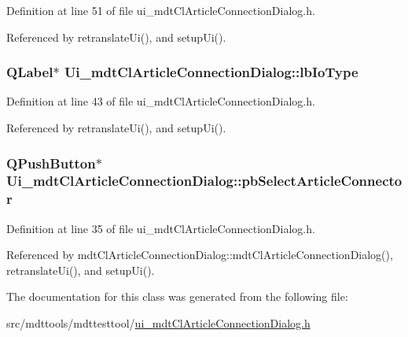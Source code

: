 Definition at line 51 of file ui\-\_\-mdt\-Cl\-Article\-Connection\-Dialog.\-h.



Referenced by retranslate\-Ui(), and setup\-Ui().

\hypertarget{class_ui__mdt_cl_article_connection_dialog_a092df073f3829e7d3250627b817a49e6}{
\subsubsection[{lb\-Io\-Type}]{\setlength{\rightskip}{0pt plus 5cm}Q\-Label$\ast$ Ui\-\_\-mdt\-Cl\-Article\-Connection\-Dialog\-::lb\-Io\-Type}}\label{class_ui__mdt_cl_article_connection_dialog_a092df073f3829e7d3250627b817a49e6}


Definition at line 43 of file ui\-\_\-mdt\-Cl\-Article\-Connection\-Dialog.\-h.



Referenced by retranslate\-Ui(), and setup\-Ui().

\hypertarget{class_ui__mdt_cl_article_connection_dialog_a4faf314284efe49f2c26bd1dba38cf05}{
\subsubsection[{pb\-Select\-Article\-Connector}]{\setlength{\rightskip}{0pt plus 5cm}Q\-Push\-Button$\ast$ Ui\-\_\-mdt\-Cl\-Article\-Connection\-Dialog\-::pb\-Select\-Article\-Connector}}\label{class_ui__mdt_cl_article_connection_dialog_a4faf314284efe49f2c26bd1dba38cf05}


Definition at line 35 of file ui\-\_\-mdt\-Cl\-Article\-Connection\-Dialog.\-h.



Referenced by mdt\-Cl\-Article\-Connection\-Dialog\-::mdt\-Cl\-Article\-Connection\-Dialog(), retranslate\-Ui(), and setup\-Ui().



The documentation for this class was generated from the following file\-:\begin{DoxyCompactItemize}
\item 
src/mdttools/mdttesttool/\hyperlink{ui__mdt_cl_article_connection_dialog_8h}{ui\-\_\-mdt\-Cl\-Article\-Connection\-Dialog.\-h}\end{DoxyCompactItemize}
